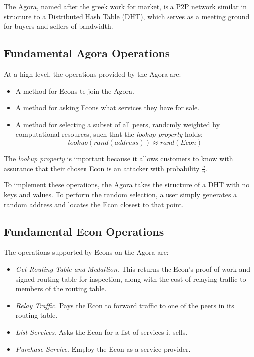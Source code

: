 
The Agora, named after the greek work for market, is a P2P network
similar in structure to a Distributed Hash Table (DHT), which serves
as a meeting ground for buyers and sellers of bandwidth.

\subsection{Fundamental Agora Operations}

At a high-level, the operations provided by the Agora are:

\begin{itemize}
\item A method for Econs to join the Agora.
\item A method for asking Econs what services they have for sale.
\item A method for selecting a subset of all peers, randomly weighted by computational resources, such that the \emph{lookup property} holds: $$lookup(rand(address)) \approx rand(Econ)$$
\end{itemize}

The \emph{lookup property} is important because it allows customers to
know with assurance that their chosen Econ is an attacker with
probability $\frac{a}{n}$.

To implement these operations, the Agora takes the structure of a DHT
with no keys and values. To perform the random selection, a user
simply generates a random address and locates the Econ closest to that
point.

\subsection{Fundamental Econ Operations}

The operations supported by Econs on the Agora are:

\begin{itemize}
\item \emph{Get Routing Table and Medallion}. This returns the Econ's proof of work and signed routing table for inspection, along with the cost of relaying traffic to members of the routing table.
\item \emph{Relay Traffic}. Pays the Econ to forward traffic to one of the peers in its routing table.
\item \emph{List Services}. Asks the Econ for a list of services it sells.
\item \emph{Purchase Service}. Employ the Econ as a service provider.
\end{itemize}

